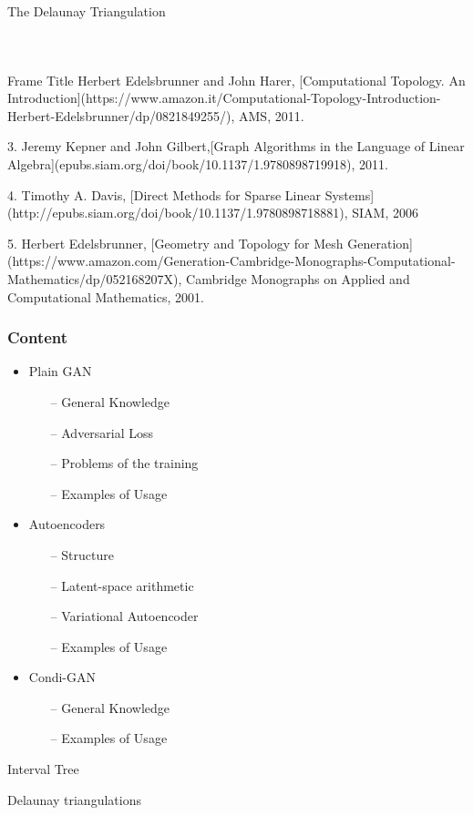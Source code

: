 \begin{frame}{The Delaunay Triangulation}
    \begin{columns}
        \begin{figure}
            \centering
        \end{figure}
    \end{columns}
\end{frame}

\begin{frame}{Frame Title}
   	Herbert Edelsbrunner and John Harer, [Computational Topology. An Introduction](https://www.amazon.it/Computational-Topology-Introduction-Herbert-Edelsbrunner/dp/0821849255/),  AMS, 2011.

3.	Jeremy Kepner and John Gilbert,[Graph Algorithms in the Language of Linear Algebra](epubs.siam.org/doi/book/10.1137/1.9780898719918), 2011.

4.	Timothy A. Davis, [Direct Methods for Sparse Linear Systems](http://epubs.siam.org/doi/book/10.1137/1.9780898718881), SIAM, 2006

5.	Herbert Edelsbrunner, [Geometry and Topology for Mesh Generation](https://www.amazon.com/Generation-Cambridge-Monographs-Computational-Mathematics/dp/052168207X), Cambridge Monographs on Applied and Computational Mathematics, 2001. \cite{Edelsbrunner2001}
\end{frame}


\begin{frame}
	\frametitle{Content}
	\begin{itemize}
		\item Plain GAN
			\begin{itemize}
				\item[--] General Knowledge
				\item[--] Adversarial Loss
				\item[--] Problems of the training
				\item[--] Examples of Usage 
			\end{itemize}
		\item Autoencoders
			\begin{itemize}
				\item[--] Structure
				\item[--] Latent-space arithmetic
				\item[--] Variational Autoencoder
				\item[--] Examples of Usage 
			\end{itemize}
		\item Condi-GAN
			\begin{itemize}
				\item[--] General Knowledge
				\item[--] Examples of Usage 
			\end{itemize}
		
	\end{itemize}
\end{frame}

\endgroup

\begin{frame}{Interval Tree}

    
\end{frame}

\begin{frame}{Delaunay triangulations}

\cite{DeBerg2008}
    
\end{frame}